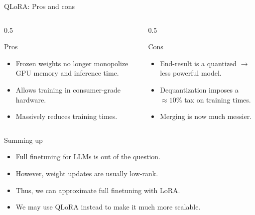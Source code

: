 \documentclass[24pt]{beamer}
\begin{document}
\begin{frame}{QLoRA: Pros and cons}
    \begin{columns}
        \begin{column}{0.5\columnwidth}
            \begin{exampleblock}{Pros}
                \begin{itemize}
                    \item Frozen weights no longer monopolize
                    \alert{GPU memory} and inference \alert{time}. \item
                    Allows training in \alert{consumer-grade} hardware.
                    \item Massively \alert{reduces training} times.
                \end{itemize}
            \end{exampleblock}
        \end{column}
        \begin{column}{0.5\columnwidth}
            \begin{alertblock}{Cons}
                \begin{itemize}
                    \item End-result is a quantized $\rightarrow$
                    \alert{
                        less
                        powerful
                    }
                    model. \item Dequantization imposes a $\approx 10\%$ tax
                    on training times. \item Merging is now much messier.
                \end{itemize}
            \end{alertblock}
        \end{column}
    \end{columns}
\end{frame}

\begin{frame}{Summing up}
	\begin{block}{}
		\begin{itemize}
			\item Full finetuning for LLMs is out of the question. \item
			However, weight updates are usually \alert{low-rank}. \item Thus, we
			can \alert{approximate} full finetuning with LoRA. \item We may use
			QLoRA instead to make it much more \alert{scalable}.
		\end{itemize}
	\end{block}
{}\end{frame}
\end{document}
